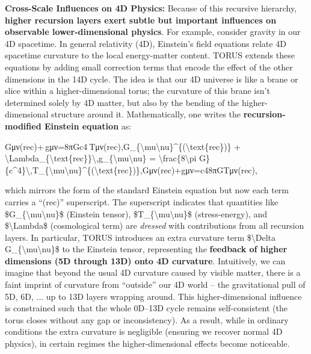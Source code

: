 \documentclass[
]{article}
\begin{document}
\textbf{Cross-Scale Influences on 4D Physics:} Because of this recursive
hierarchy, \textbf{higher recursion layers exert subtle but important
influences on observable lower-dimensional physics}. For example,
consider gravity in our 4D spacetime. In general relativity (4D),
Einstein's field equations relate 4D spacetime curvature to the local
energy-matter content. TORUS extends these equations by adding small
correction terms that encode the effect of the other dimensions in the
14D cycle. The idea is that our 4D universe is like a brane or slice
within a higher-dimensional torus; the curvature of this brane isn't
determined solely by 4D matter, but also by the bending of the
higher-dimensional structure around it. Mathematically, one writes the
\textbf{recursion-modified Einstein equation} as:

Gμν(rec)+\Lambdarec gμν=8πGc4 Tμν(rec),G\_\{\textbackslash mu\textbackslash nu\}\^{}\{(\textbackslash text\{rec\})\}
+
\textbackslash Lambda\_\{\textbackslash text\{rec\}\}\textbackslash,g\_\{\textbackslash mu\textbackslash nu\}
= \textbackslash frac\{8\textbackslash pi
G\}\{c\^{}4\}\textbackslash,T\_\{\textbackslash mu\textbackslash nu\}\^{}\{(\textbackslash text\{rec\})\},Gμν(rec)\hspace{0pt}+\Lambdarec\hspace{0pt}gμν\hspace{0pt}=c48πG\hspace{0pt}Tμν(rec)\hspace{0pt},

which mirrors the form of the standard Einstein equation but now each
term carries a ``(rec)'' superscript\hspace{0pt}. The superscript
indicates that quantities like
\$G\_\{\textbackslash mu\textbackslash nu\}\$ (Einstein tensor),
\$T\_\{\textbackslash mu\textbackslash nu\}\$ (stress-energy), and
\$\textbackslash Lambda\$ (cosmological term) are \emph{dressed} with
contributions from all recursion layers\hspace{0pt}. In particular,
TORUS introduces an extra curvature term \$\textbackslash Delta
G\_\{\textbackslash mu\textbackslash nu\}\$ to the Einstein tensor,
representing the \textbf{feedback of higher dimensions (5D through 13D)
onto 4D curvature}\hspace{0pt}. Intuitively, we can imagine that beyond
the usual 4D curvature caused by visible matter, there is a faint
imprint of curvature from ``outside'' our 4D world -- the gravitational
pull of 5D, 6D, ... up to 13D layers wrapping around. This
higher-dimensional influence is constrained such that the whole 0D--13D
cycle remains self-consistent (the torus closes without any gap or
inconsistency). As a result, while in ordinary conditions the extra
curvature is negligible (ensuring we recover normal 4D physics), in
certain regimes the higher-dimensional effects become noticeable.
\end{document}

